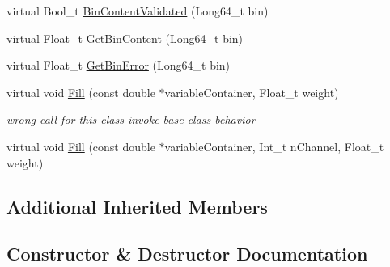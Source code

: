 \begin{DoxyCompactItemize}
virtual Bool\+\_\+t \mbox{\hyperlink{classQn_1_1CorrectionHistogramChannelizedSparse_a46f0289fe5ddd088356679486d8376d6}{Bin\+Content\+Validated}} (Long64\+\_\+t bin)
\item 
virtual Float\+\_\+t \mbox{\hyperlink{classQn_1_1CorrectionHistogramChannelizedSparse_a247aa9d6cadd6c5373ed4cf0cde8b719}{Get\+Bin\+Content}} (Long64\+\_\+t bin)
\item 
virtual Float\+\_\+t \mbox{\hyperlink{classQn_1_1CorrectionHistogramChannelizedSparse_a1b683c6af5cf7dea4d0ee9fa367e0d09}{Get\+Bin\+Error}} (Long64\+\_\+t bin)
\item 
\mbox{\label{classQn_1_1CorrectionHistogramChannelizedSparse_adcd90b4926b6932cd9b50a9790d172b1}} 
virtual void \mbox{\hyperlink{classQn_1_1CorrectionHistogramChannelizedSparse_adcd90b4926b6932cd9b50a9790d172b1}{Fill}} (const double $\ast$variable\+Container, Float\+\_\+t weight)
\begin{DoxyCompactList}\small\item\em wrong call for this class invoke base class behavior \end{DoxyCompactList}\item 
virtual void \mbox{\hyperlink{classQn_1_1CorrectionHistogramChannelizedSparse_a11c6c6d5b037fdf9c4f03d2f54e7a526}{Fill}} (const double $\ast$variable\+Container, Int\+\_\+t n\+Channel, Float\+\_\+t weight)
\end{DoxyCompactItemize}
\subsection*{Additional Inherited Members}


\subsection{Constructor \& Destructor Documentation}
\mbox{\label{classQn_1_1CorrectionHistogramChannelizedSparse_a018a19416ce8241d58db9d611cfcc1ac}} 
